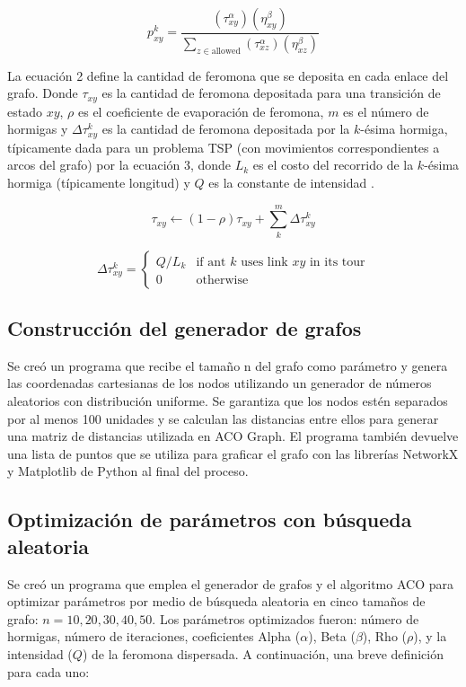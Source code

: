\documentclass[conference]{IEEEtran}
\begin{document}
\begin{equation}
p_{xy}^{k} = \frac{(\tau_{xy}^\alpha)(\eta_{xy}^\beta)}{\sum_{z\in\text{allowed}} (\tau_{xz}^\alpha)(\eta_{xz}^\beta)}
\end{equation}

La ecuación 2 define la cantidad de feromona que se deposita en cada enlace del grafo. Donde $\tau_{xy}$ es la cantidad de feromona depositada para una transición de estado $xy$, $\rho$ es el coeficiente de evaporación de feromona, $m$ es el número de hormigas y $\Delta \tau_{xy}^{k}$ es la cantidad de feromona depositada por la $k$-ésima hormiga, típicamente dada para un problema TSP (con movimientos correspondientes a arcos del grafo) por la ecuación 3, donde $L_k$ es el costo del recorrido de la $k$-ésima hormiga (típicamente longitud) y $Q$ es la constante de intensidad \cite{aco_wiki}.

\begin{equation}
\tau_{xy} \gets (1-\rho)\tau_{xy} + \sum_{k}^{m} \Delta\tau_{xy}^{k}
\end{equation}

\begin{equation}
  \Delta\tau^{k}_{xy} =
  \begin{cases}
    Q/L_{k} & \text{if ant } k \text{ uses link } {xy} \text{ in its tour} \\
    0 & \text{otherwise}
  \end{cases}
\end{equation}

\subsection{Construcción del generador de grafos}
Se creó un programa que recibe el tamaño n del grafo como parámetro y genera las coordenadas cartesianas de los nodos utilizando un generador de números aleatorios con distribución uniforme. Se garantiza que los nodos estén separados por al menos 100 unidades y se calculan las distancias entre ellos para generar una matriz de distancias utilizada en ACO Graph. El programa también devuelve una lista de puntos que se utiliza para graficar el grafo con las librerías NetworkX y Matplotlib de Python al final del proceso.
\subsection{Optimización de parámetros con búsqueda aleatoria}
Se creó un programa que emplea el generador de grafos y el algoritmo ACO para optimizar parámetros por medio de búsqueda aleatoria en cinco tamaños de grafo: $n=10,20,30,40,50$. Los parámetros optimizados fueron: número de hormigas, número de iteraciones, coeficientes Alpha ($\alpha$), Beta ($\beta$), Rho ($\rho$), y la intensidad ($Q$) de la feromona dispersada. A continuación, una breve definición para cada uno:
\end{document}
